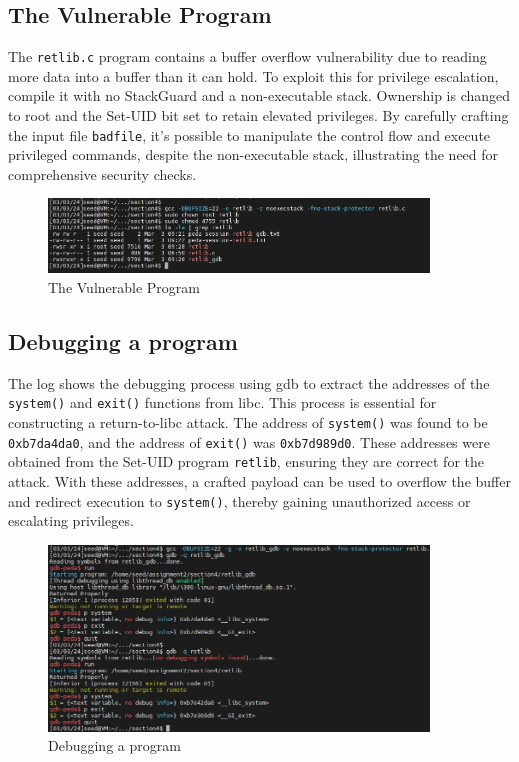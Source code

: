 \documentclass[a4paper,11pt]{article}
\begin{document}
\subsection{The Vulnerable Program}
The \verb|retlib.c| program contains a buffer overflow vulnerability due to reading more data into a buffer than it can hold. To exploit this for privilege escalation, compile it with no StackGuard and a non-executable stack. Ownership is changed to root and the Set-UID bit set to retain elevated privileges. By carefully crafting the input file \verb|badfile|, it's possible to manipulate the control flow and execute privileged commands, despite the non-executable stack, illustrating the need for comprehensive security checks.
\begin{figure}[h]
    \centering
       \includegraphics[width=0.9\textwidth]{figures/task16/task16.png}
    \caption{The Vulnerable Program}\label{fig:task16}
\end{figure}

\subsection{Debugging a program}
The log shows the debugging process using gdb to extract the addresses of the \verb|system()| and \verb|exit()| functions from libc. This process is essential for constructing a return-to-libc attack. The address of \verb|system()| was found to be \verb|0xb7da4da0|, and the address of \verb|exit()| was \verb|0xb7d989d0|. These addresses were obtained from the Set-UID program \verb|retlib|, ensuring they are correct for the attack. With these addresses, a crafted payload can be used to overflow the buffer and redirect execution to \verb|system()|, thereby gaining unauthorized access or escalating privileges.
\begin{figure}[h]
    \centering
       \includegraphics[width=0.9\textwidth]{figures/task17/task17.png}
    \caption{Debugging a program}\label{fig:task17}
\end{figure}
\end{document}
